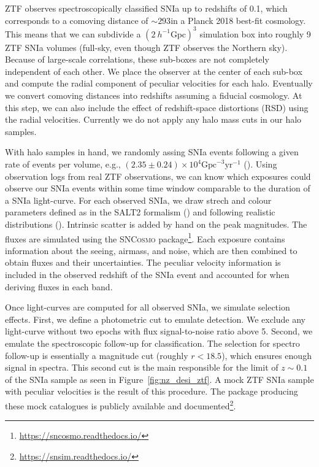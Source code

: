 ZTF observes spectroscopically classified SNIa 
up to redshifts of 0.1, which corresponds to a comoving distance 
of $\sim 293$\hmpc in a Planck 2018 best-fit cosmology. 
This means that we can subdivide a $(2~h^{-1}\text{Gpc})^3$ simulation box into 
roughly 9 ZTF SNIa volumes (full-sky, even though ZTF observes the Northern sky).  
Because of large-scale correlations, these sub-boxes are not completely independent of each other. 
We place the observer at the center of each sub-box and compute the radial 
component of peculiar velocities for each halo. 
Eventually we convert comoving distances into redshifts assuming a fiducial cosmology. 
At this step, we can also include the effect of redshift-space distortions (RSD) using the radial velocities.
Currently we do not apply any halo mass cuts in our halo samples. 

With halo samples in hand, we randomly assing SNIa events following a given rate of 
events per volume, e.g., $(2.35 \pm 0.24) \times 10^4 \text{Gpc}^{-3} \text{yr}^{-1}$ 
(\cite{perleyZwickyTransientFacility2020}).
Using observation logs from real ZTF observations, we can know which exposures 
could observe our SNIa events within some time window comparable to the duration of 
a SNIa light-curve. For each observed SNIa, we draw strech and colour parameters 
defined as in the SALT2 formalism (\cite{guySALT2UsingDistant2007}) and following 
realistic distributions
(\cite{scolnicMEASURINGTYPEIA2016, nicolasRedshiftEvolutionUnderlying2021}).
Intrinsic scatter is added by hand on the peak magnitudes. 
The fluxes are simulated using the \textsc{SNCosmo} package\footnote{\url{https://sncosmo.readthedocs.io/}}.
Each exposure contains information about the seeing, airmass, and noise, which are then combined 
to obtain fluxes and their uncertainties. 
The peculiar velocity information is included in the observed redshift of the SNIa event
and accounted for when deriving fluxes in each band. 

Once light-curves are computed for all observed SNIa, we simulate 
selection effects. First, we define a photometric cut to emulate detection.
We exclude any light-curve without two epochs with flux signal-to-noise ratio 
above 5. Second, we emulate the spectroscopic follow-up for classification.
The selection for spectro follow-up is essentially a magnitude cut (roughly $r<18.5$),
which ensures enough signal in spectra.  
This second cut is the main responsible for the limit of $z \sim 0.1$ of the SNIa sample 
as seen in Figure~\ref{fig:nz_desi_ztf}. 
A mock ZTF SNIa sample with peculiar velocities is the result of this procedure. 
The package producing these mock catalogues is publicly 
available and documented\footnote{\url{https://snsim.readthedocs.io/}}. 

